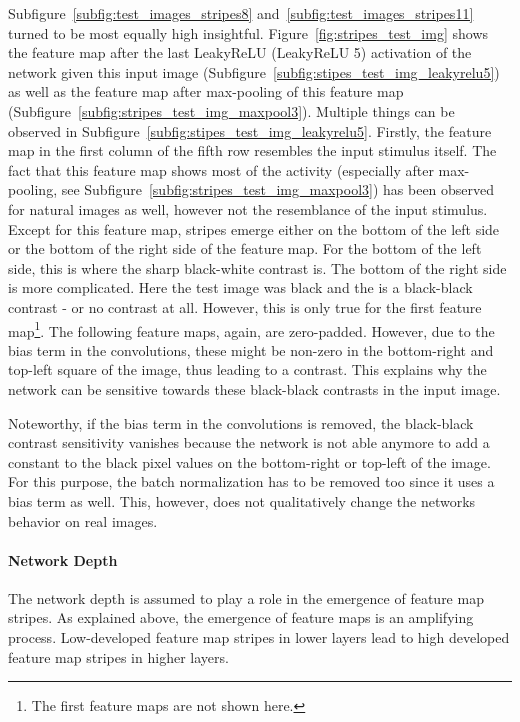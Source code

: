 Subfigure~\ref{subfig:test_images_stripes8} and~\ref{subfig:test_images_stripes11} turned to be most equally high insightful.
Figure~\ref{fig:stripes_test_img} shows the feature map after the last LeakyReLU (LeakyReLU 5) activation of the network given this input image (Subfigure~\ref{subfig:stipes_test_img_leakyrelu5}) as well as the feature map after max-pooling of this feature map (Subfigure~\ref{subfig:stripes_test_img_maxpool3}).
Multiple things can be observed in Subfigure~\ref{subfig:stipes_test_img_leakyrelu5}.
Firstly, the feature map in the first column of the fifth row resembles the input stimulus itself.
The fact that this feature map shows most of the activity (especially after max-pooling, see Subfigure~\ref{subfig:stripes_test_img_maxpool3}) has been observed for natural images as well, however not the resemblance of the input stimulus.
Except for this feature map, stripes emerge either on the bottom of the left side or the bottom of the right side of the feature map.
For the bottom of the left side, this is where the sharp black-white contrast is.
The bottom of the right side is more complicated.
Here the test image was black and the  is a black-black contrast - or no contrast at all.
However, this is only true for the first feature map\footnote{The first feature maps are not shown here.}.
The following feature maps, again, are zero-padded.
However, due to the bias term in the convolutions, these might be non-zero in the bottom-right and top-left square of the image, thus leading to a contrast.
This explains why the network can be sensitive towards these black-black contrasts in the input image.

Noteworthy, if the bias term in the convolutions is removed, the black-black contrast sensitivity vanishes because the network is not able anymore to add a constant to the black pixel values on the bottom-right or top-left of the image.
For this purpose, the batch normalization has to be removed too since it uses a bias term as well.
This, however, does not qualitatively change the networks behavior on real images.

\paragraph{Network Depth}
The network depth is assumed to play a role in the emergence of feature map stripes.
As explained above, the emergence of feature maps is an amplifying process.
Low-developed feature map stripes in lower layers lead to high developed feature map stripes in higher layers.

